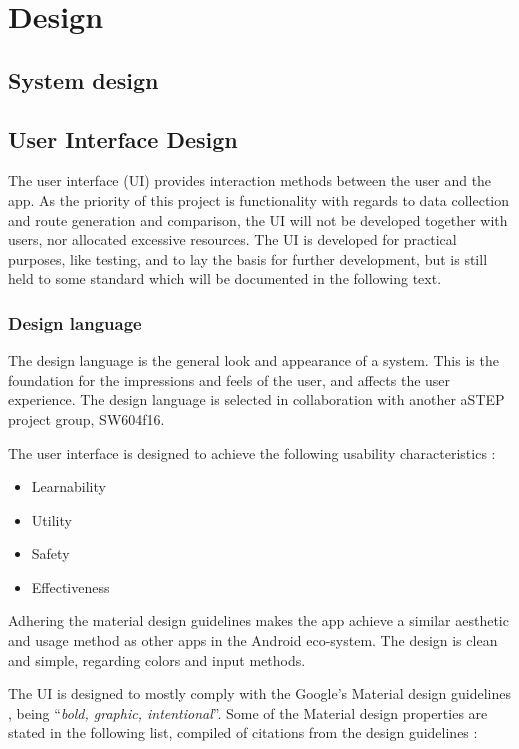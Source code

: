 \section{Design}

\subsection{System design}


\subsection{User Interface Design}
The user interface (UI) provides interaction methods between the user and the app.
As the priority of this project is functionality with regards to data collection and route generation and comparison, the UI will not be developed together with users, nor allocated excessive resources. 
The UI is developed for practical purposes, like testing, and to lay the basis for further development, but is still held to some standard which will be documented in the following text. 

\subsubsection{Design language}
The design language is the general look and appearance of a system.
This is the foundation for the impressions and feels of the user, and affects the user experience.
The design language is selected in collaboration with another aSTEP project group, SW604f16.

The user interface is designed to achieve the following usability characteristics \cite{DIS2014}:
\begin{itemize}
	\item Learnability
	\item Utility
	\item Safety
	\item Effectiveness
\end{itemize}

Adhering the material design guidelines makes the app achieve a similar aesthetic and usage method as other apps in the Android eco-system. 
The design is clean and simple, regarding colors and input methods.

The UI is designed to mostly comply with the Google's Material design guidelines \cite{materialDesign}, being ``\textit{bold, graphic, intentional}''. 
Some of the Material design properties are stated in the following list, compiled of citations from the design guidelines \cite{materialProperties}:

